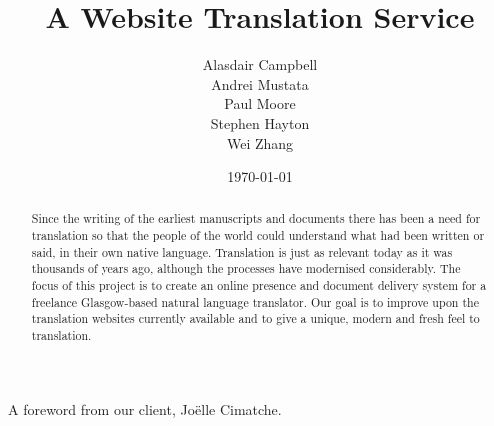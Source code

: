 \documentclass{l3proj}
\begin{document}
\title{A Website Translation Service}
\author{Alasdair Campbell \\
	Andrei Mustata \\
	Paul Moore \\
        Stephen Hayton \\
	Wei Zhang}
\date{\today}


\maketitle
\begin{abstract}

Since the writing of the earliest manuscripts and documents there has been a
need for translation so that the people of the world could understand what had
been written or said, in their own native language. Translation is just as
relevant today as it was thousands of years ago, although the processes have
modernised considerably. The focus of this project is to create an online
presence and document delivery system for a freelance Glasgow-based natural
language translator. Our goal is to improve upon the translation websites
currently available and to give a unique, modern and fresh feel to translation.

\end{abstract}
\educationalconsent
\tableofcontents
\newpage
\begin{flushleft}
A foreword from our client, Jo\"{e}lle Cimatche.
\end{flushleft}	
\end{document}
